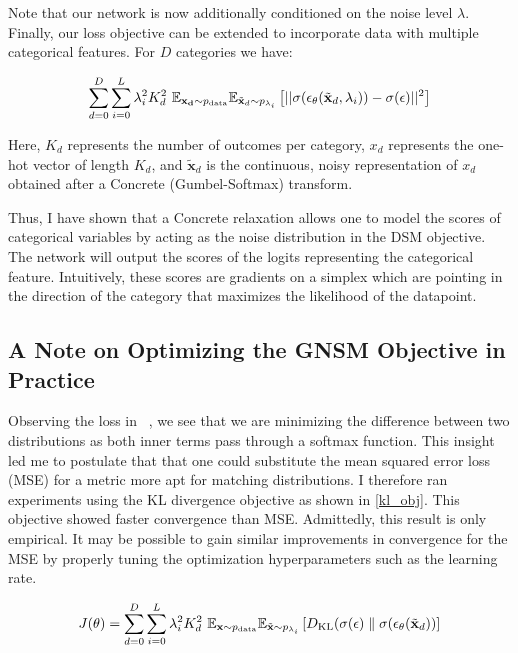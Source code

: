 Note that our network is now additionally conditioned on the noise level $\lambda$. Finally, our loss objective can be extended to incorporate data with multiple categorical features. For $D$ categories we have:

\begin{equation}
\label{eq:ncsn_obj}
    \sum_{d=0}^{D} \sum_{i=0}^{L} \lambda_i^2 K_d^2 ~\mathbb{E}_{\mathbf{x_d} \sim p_{\text{data}}} \mathbb{E}_{\Tilde{\mathbf{x}}_d \sim p_{\lambda_i}} \left[ { || \sigma( \epsilon_\theta(\tilde{\mathbf{x}}_d,  \lambda_i) ) - \sigma(\epsilon)||^2 } \right]
\end{equation}

Here, $K_d$ represents the number of outcomes per category, $x_d$ represents the one-hot vector of length $K_d$, and  $\tilde{\mathbf{x}}_d$ is the continuous, noisy representation of $x_d$ obtained after a Concrete (Gumbel-Softmax) transform.

Thus, I have shown that a Concrete relaxation allows one to model the scores of categorical variables by acting as the noise distribution in the DSM objective. The network will output the scores of the logits representing the categorical feature. Intuitively, these scores are gradients on a simplex which are pointing in the direction of the category that maximizes the likelihood of the datapoint.

\subsection*{A Note on Optimizing the GNSM Objective in Practice}

Observing the loss in ~, we see that we are minimizing the difference between two distributions as both inner terms pass through a softmax function. This insight led me to postulate that that one could substitute the mean squared error loss (MSE) for a metric more apt for matching distributions. I therefore ran experiments using the KL divergence objective as shown in \eqref{kl_obj}. This objective showed faster convergence than MSE. Admittedly, this result is only empirical. It may be possible to gain similar improvements in convergence for the MSE by properly tuning the optimization hyperparameters such as the learning rate.

\begin{equation}
\label{kl_obj}
    J(\theta)  =  \sum_{d=0}^{D} \sum_{i=0}^{L} \lambda_i^2 K_d^2 ~\mathbb{E}_{\mathbf{x} \sim p_{\text{data}}} \mathbb{E}_{\Tilde{\mathbf{x}} \sim p_{\lambda_i}} \left[ { D_{\text{KL}} (\sigma(\epsilon) \parallel  \sigma( \epsilon_\theta(\tilde{\mathbf{x}}_d) ) } \right]
\end{equation}


